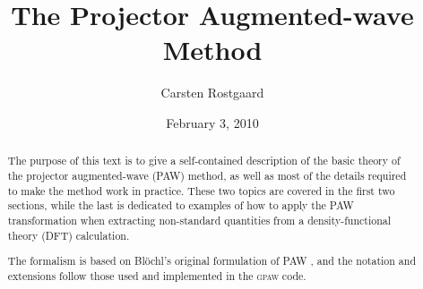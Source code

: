 \documentclass[a4paper]{article}
\title{\vspace*{-21mm}%
  \textbf{The Projector Augmented-wave Method}}
\author{Carsten Rostgaard}
\date{February 3, 2010}
\newcommand{\gpaw}{\textsc{gpaw}}
\begin{document}
\thispagestyle{empty}
\maketitle
\begin{abstract}
  The purpose of this text is to give a self-contained description of
  the basic theory of the projector augmented-wave (PAW) method, as
  well as most of the details required to make the method work in
  practice. These two topics are covered in the first two sections,
  while the last is dedicated to examples of how to apply the PAW
  transformation when extracting non-standard quantities from a
  density-functional theory (DFT) calculation.

  The formalism is based on Bl{\"o}chl's original formulation of PAW
  \cite{Blochl1994}, and the notation and extensions follow those used
  and implemented in the \gpaw\cite{gpaw} code.
\end{abstract}
\tableofcontents
\clearpage
\end{document}
